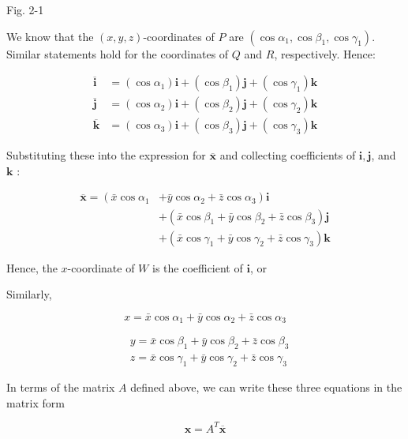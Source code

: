 \documentclass[10pt]{article}
\begin{document}
Fig. 2-1

We know that the $(x, y, z)$-coordinates of $P$ are $\left(\cos \alpha_{1}, \cos \beta_{1}, \cos \gamma_{1}\right)$. Similar statements hold for the coordinates of $Q$ and $R$, respectively. Hence:

$$
\begin{aligned}
\overline{\mathbf{i}} & =\left(\cos \alpha_{1}\right) \mathbf{i}+\left(\cos \beta_{1}\right) \mathbf{j}+\left(\cos \gamma_{1}\right) \mathbf{k} \\
\overline{\mathbf{j}} & =\left(\cos \alpha_{2}\right) \mathbf{i}+\left(\cos \beta_{2}\right) \mathbf{j}+\left(\cos \gamma_{2}\right) \mathbf{k} \\
\overline{\mathbf{k}} & =\left(\cos \alpha_{3}\right) \mathbf{i}+\left(\cos \beta_{3}\right) \mathbf{j}+\left(\cos \gamma_{3}\right) \mathbf{k}
\end{aligned}
$$

Substituting these into the expression for $\overline{\mathbf{x}}$ and collecting coefficients of $\mathbf{i}, \mathbf{j}$, and $\mathbf{k}$ :

$$
\begin{aligned}
\overline{\mathbf{x}}=\left(\bar{x} \cos \alpha_{1}\right. & \left.+\bar{y} \cos \alpha_{2}+\bar{z} \cos \alpha_{3}\right) \mathbf{i} \\
& +\left(\bar{x} \cos \beta_{1}+\bar{y} \cos \beta_{2}+\bar{z} \cos \beta_{3}\right) \mathbf{j} \\
& +\left(\bar{x} \cos \gamma_{1}+\bar{y} \cos \gamma_{2}+\bar{z} \cos \gamma_{3}\right) \mathbf{k}
\end{aligned}
$$

Hence, the $x$-coordinate of $W$ is the coefficient of $\mathbf{i}$, or

Similarly,

$$
x=\bar{x} \cos \alpha_{1}+\bar{y} \cos \alpha_{2}+\bar{z} \cos \alpha_{3}
$$

$$
\begin{aligned}
& y=\bar{x} \cos \beta_{1}+\bar{y} \cos \beta_{2}+\bar{z} \cos \beta_{3} \\
& z=\bar{x} \cos \gamma_{1}+\bar{y} \cos \gamma_{2}+\bar{z} \cos \gamma_{3}
\end{aligned}
$$

In terms of the matrix $A$ defined above, we can write these three equations in the matrix form


\begin{equation*}
\mathbf{x}=A^{T} \overline{\mathbf{x}} \tag{1}
\end{equation*}
\end{document}
